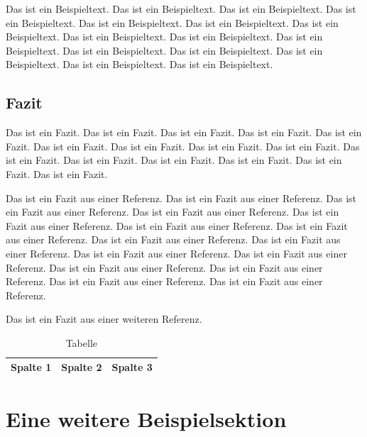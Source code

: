 Das ist ein Beispieltext. Das ist ein Beispieltext. Das ist ein Beispieltext. Das ist ein Beispieltext. Das ist ein Beispieltext. Das ist ein Beispieltext. Das ist ein Beispieltext. Das ist ein Beispieltext. Das ist ein Beispieltext. Das ist ein Beispieltext. Das ist ein Beispieltext. Das ist ein Beispieltext. Das ist ein Beispieltext. Das ist ein Beispieltext. Das ist ein Beispieltext.

\subsection{Fazit}
Das ist ein Fazit. Das ist ein Fazit. Das ist ein Fazit. Das ist ein Fazit. Das ist ein Fazit. Das ist ein Fazit. Das ist ein Fazit. Das ist ein Fazit. Das ist ein Fazit. Das ist ein Fazit. Das ist ein Fazit. Das ist ein Fazit. Das ist ein Fazit. Das ist ein Fazit. Das ist ein Fazit.

Das ist ein Fazit aus einer Referenz. Das ist ein Fazit aus einer Referenz. Das ist ein Fazit aus einer Referenz. Das ist ein Fazit aus einer Referenz. Das ist ein Fazit aus einer Referenz. Das ist ein Fazit aus einer Referenz. Das ist ein Fazit aus einer Referenz. Das ist ein Fazit aus einer Referenz. Das ist ein Fazit aus einer Referenz. Das ist ein Fazit aus einer Referenz. Das ist ein Fazit aus einer Referenz. Das ist ein Fazit aus einer Referenz. Das ist ein Fazit aus einer Referenz. Das ist ein Fazit aus einer Referenz. Das ist ein Fazit aus einer Referenz. \cite{000:Reference}

Das ist ein Fazit aus einer weiteren Referenz. \cite{001:Reference}

\begin{table}
	\centering
	\begin{tabulary}{\textwidth}{|L|L|L|}
		\hline
		Spalte 1 & Spalte 2 & Spalte 3 \\\hline
	\end{tabulary}
	\caption{Tabelle}
\end{table}

\section{Eine weitere Beispielsektion}


